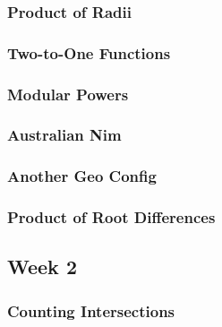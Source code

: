 \documentclass[titlepage=true]{scrartcl}
\begin{document}
        \subsubsection{Product of Radii}
            \label{8-1-2}  
            
        \newpage

        \subsubsection{Two-to-One Functions}
            \label{8-1-3}  
            
        \newpage

        \subsubsection{Modular Powers}
            \label{8-1-4}  
            
        \newpage

        \subsubsection{Australian Nim}
            \label{8-1-5}  
            
        \newpage

        \subsubsection{Another Geo Config}
            \label{8-1-6}  
            
        \newpage

        \subsubsection{Product of Root Differences}
            \label{8-1-7}  
            
        \newpage


    \subsection{Week 2}
    
        \subsubsection{Counting Intersections}
            \label{8-2-1}  
            
        \newpage
    
\end{document}
